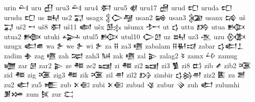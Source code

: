  urin  𒌶   
 uru  𒌷   
 uru3  𒌶   
 uru4  𒀳   
 uru5  𒋽   
 uru17  𒍇   
 urud  𒍏   
 uruda  𒍏   
 urudu  𒍏   
 us  𒊻   
 us2  𒍑   
 usagx  𒉭𒀖𒆷        
 usan2  𒄝   
 usan3  𒉮   
 usanx  𒄙   
 uš  𒍑   
 uš2  𒍗   
 uš8  𒀳   
 uš11  𒅜   
 ušx  𒍖   
 ušumx  𒍘   
 ut  𒌓   
 uttu  𒋸   
 utua  𒁭   
 utua2  𒁦   
 utuki  𒍙   
 utul5  𒁟   
 utul10  𒀖𒇻    
 uz  𒊻   
 uz3  𒍚   
 uzu  𒍜   
 uzugx  𒅗𒌑    
 wa  𒉿   
 we  𒉿   
 wi  𒉿   
 za  𒍝   
 za3  𒍠   
 zabalam  𒍝𒈽𒀕    
 zabar  𒌓𒅗𒁇    
 zadim  𒈯   
 zag  𒍠   
 zah  𒉈   
 zah3  𒀄   
 zak  𒍠   
 zal  𒉌   
 zalag2  𒂟   
 zamx  𒍡   
 zamug  𒁾   
 zar  𒇡   
 zar2  𒉌   
 ze  𒍣   
 ze2  𒍢   
 zi  𒍣   
 zi2  𒍢   
 zi3  𒍥   
 zi8  𒆗   
 zib  𒍦   
 zib2  𒍨   
 zid  𒍣   
 zig  𒍨   
 zig3  𒍣   
 zik  𒍨   
 zil  𒉣   
 zil2  𒋳   
 zimbir  𒌓𒄒𒉣    
 ziz2  𒍩   
 zu  𒍪   
 zu2  𒅗   
 zu5  𒍫   
 zub  𒉽𒈿    
 zubi  𒉽𒈿    
 zubud  𒄪   
 zubur  𒍭   
 zuh  𒅗   
 zulumhi  𒋠𒋤    
 zum  𒍮   
 zur  𒀫   
